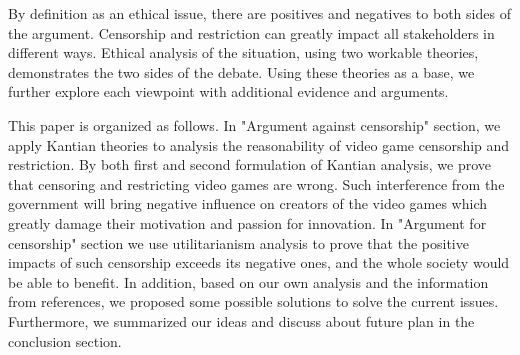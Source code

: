 By definition as an ethical issue, there are positives and negatives to both sides of the argument. Censorship and restriction can greatly impact all stakeholders in different ways. Ethical analysis of the situation, using two workable theories, demonstrates the two sides of the debate. Using these theories as a base, we further explore each viewpoint with additional evidence and arguments.

This paper is organized as follows. In "Argument against censorship" section, we apply Kantian theories to analysis the reasonability of video game censorship and restriction. By both first and second formulation of Kantian analysis, we prove that censoring and restricting video games are wrong. Such interference from the government will bring negative influence on creators of the video games which greatly damage their motivation and passion for innovation. In "Argument for censorship" section we use utilitarianism analysis to prove that the positive impacts of such censorship exceeds its negative ones, and the whole society would be able to benefit. In addition, based on our own analysis and the information from references, we proposed some possible solutions to solve the current issues. Furthermore, we summarized our ideas and discuss about future plan in the conclusion section.